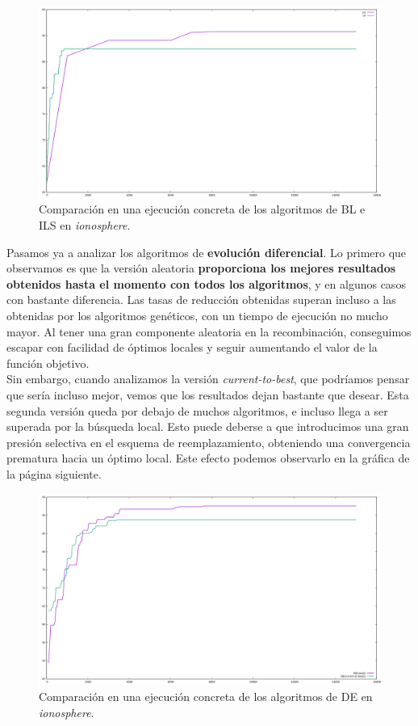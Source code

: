 \documentclass[12pt]{article}
\begin{document}
\begin{figure}[ht!]
    \centering
    \includegraphics[width=.9\textwidth]{img/ILS-LS.png}
	\caption{Comparación en una ejecución concreta de los algoritmos de BL e ILS en \textit{ionosphere}.}
\end{figure}

Pasamos ya a analizar los algoritmos de \textbf{evolución diferencial}. Lo primero que observamos es que la versión aleatoria \textbf{proporciona los mejores resultados obtenidos hasta el momento con todos los algoritmos}, y en algunos casos con bastante diferencia. Las tasas de reducción obtenidas superan incluso a las obtenidas por los algoritmos genéticos, con un tiempo de ejecución no mucho mayor. Al tener una gran componente aleatoria en la recombinación, conseguimos escapar con facilidad de óptimos locales y seguir aumentando el valor de la función objetivo.\\

Sin embargo, cuando analizamos la versión \textit{current-to-best}, que podríamos pensar que sería incluso mejor, vemos que los resultados dejan bastante que desear. Esta segunda versión queda por debajo de muchos algoritmos, e incluso llega a ser superada por la búsqueda local. Esto puede deberse a que introducimos una gran presión selectiva en el esquema de reemplazamiento, obteniendo una convergencia prematura hacia un óptimo local. Este efecto podemos observarlo en la gráfica de la página siguiente.\\

\begin{figure}[ht!]
    \centering
    \includegraphics[width=.9\textwidth]{img/DE.png}
	\caption{Comparación en una ejecución concreta de los algoritmos de DE en \textit{ionosphere}.}
\end{figure}
\end{document}
